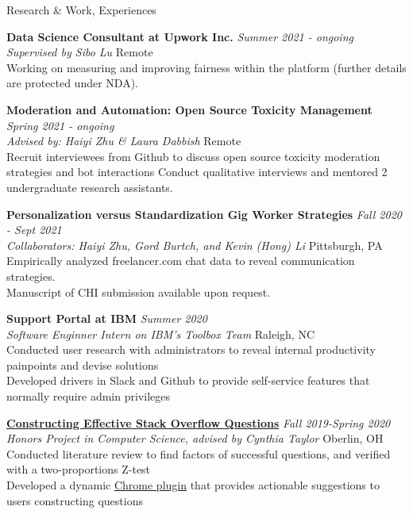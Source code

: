 \documentclass{resume}
\begin{document}
\begin{rSection}{Research \& Work, Experiences}

{\bf Data Science Consultant at Upwork Inc.} \hfill  {\em Summer 2021 - ongoing} \\
{\it Supervised by Sibo Lu} \hfill {Remote} \\
{Working on measuring and improving fairness within the platform (further details are protected under NDA).} 

{\bf Moderation and Automation: Open Source Toxicity Management} \hfill  {\em Spring 2021 - ongoing} \\
{\it Advised by: Haiyi Zhu \& Laura Dabbish} \hfill {Remote} \\
{Recruit interviewees from Github to discuss open source toxicity moderation strategies and bot interactions}
{Conduct qualitative interviews and mentored 2 undergraduate research assistants.}

{\bf Personalization versus Standardization Gig Worker Strategies} \hfill  {\em Fall 2020 - Sept 2021} \\
{\it Collaborators: Haiyi Zhu, Gord Burtch, and Kevin (Hong) Li} \hfill { Pittsburgh, PA} \\
{Empirically analyzed freelancer.com chat data to reveal communication  strategies.} \\
{Manuscript of CHI submission available upon request.}

{\bf Support Portal at IBM} \hfill  {\em Summer 2020} \\
{\it Software Enginner Intern on IBM's Toolbox Team} \hfill { Raleigh, NC} \\
{Conducted user research with administrators to reveal internal productivity painpoints and devise solutions} \\
{Developed drivers in Slack and Github to provide self-service features that normally require admin privileges}

\href{https://digitalcommons.oberlin.edu/cgi/viewcontent.cgi?article=1693&context=honors}{\bf Constructing Effective Stack Overflow Questions} \hfill  {\em Fall 2019-Spring 2020} \\
{\it Honors Project in Computer Science, advised by Cynthia Taylor} \hfill { Oberlin, OH} \\
{Conducted literature review to find factors of successful questions, and verified with a two-proportions Z-test} \\
{Developed a dynamic \href{https://github.com/janeon/honors-plugin}{Chrome plugin} that provides actionable suggestions to users constructing questions}


\end{rSection}
\end{document}
